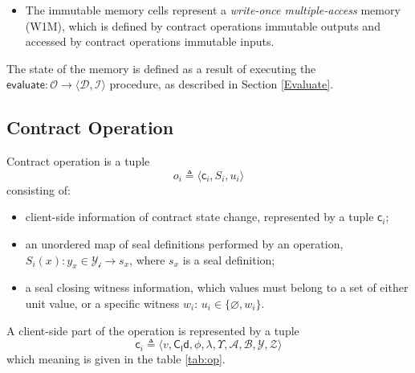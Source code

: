 \documentclass[9pt,oneside]{amsart}
\begin{document}
\begin{multicols}{2}
\begin{itemize}
\item The immutable memory cells represent a \emph{write-once multiple-access} memory (W1M),
  which is defined by contract operations immutable outputs
  and accessed by contract operations immutable inputs.
\end{itemize}

The state of the memory is defined as a result of executing the
$\mathsf{evaluate}: \mathcal{O} \rightarrow \langle \mathcal{D}, \mathcal{I} \rangle$ procedure,
as described in Section \ref{Evaluate}.

\subsection{Contract Operation}\label{Operation}

Contract operation is a tuple
\begin{equation}
o_i \triangleq \langle \mathsf{c}_i, S_i, u_i \rangle
\end{equation}
\noindent
consisting of:
\noindent
\begin{itemize}
\item client-side information of contract state change, represented by a tuple $\mathsf{c}_i$;
\item an unordered map of seal definitions performed by an operation,
  $S_i(x): y_x \in \mathcal{Y_i} \rightarrow s_x$, where $s_x$ is a seal definition;
\item a seal closing witness information,
  which values must belong to a set of either unit value, or a specific witness $w_i$:
  $u_i \in \{ \varnothing, w_i \}$.
\end{itemize}

A client-side part of the operation is represented by a tuple
\noindent
\begin{equation}
\mathsf{c}_i \triangleq \langle v, \mathsf{C_Id}, \phi, \lambda, \Upsilon, \mathcal{A}, \mathcal{B}, \mathcal{Y}, \mathcal{Z} \rangle
\end{equation}
\noindent
which meaning is given in the table \ref{tab:op}.

\end{multicols}
\end{document}
